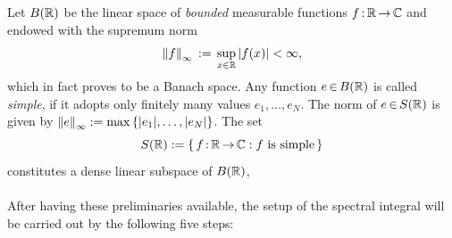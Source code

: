 \documentclass[11pt,twoside]{article}
\begin{document}
\subparagraph{}
Let $B({\mathbb{R}})$ be the linear space of \textit{bounded} measurable functions
$f{\,:\,}{\mathbb{R}} {\,\to\,} {\mathbb{C}}$ and endowed with the supremum norm
\[
\norm{f}_{\infty} \eqdef \sup_{x \in \R} \, \abs{f(x) } < \infty,
\]
which in fact proves to be a Banach space.
Any function $e {\,\in\,} B({\mathbb{R}})$ is called \textit{simple},
if it adopts only finitely many values $e_1,\ldots, e_N$.
The norm of $e {\,\in\,} S({\mathbb{R}})$ is given by
$\norm{e}_{\infty} := \max \, \{\abs{e_1} ,\ldots, \abs{e_N} \}$.
The set
\[
S({\mathbb{R}}) := \{\,f{\,:\,}{\mathbb{R}} {\,\to\,} {\mathbb{C}}: f \mbox{ is simple}\,\}
\]
constitutes a dense linear subspace of $B({\mathbb{R}})$,

\paragraph{}
After having these preliminaries available,
the setup of the spectral integral will be carried out
by the following five steps:
\end{document}
